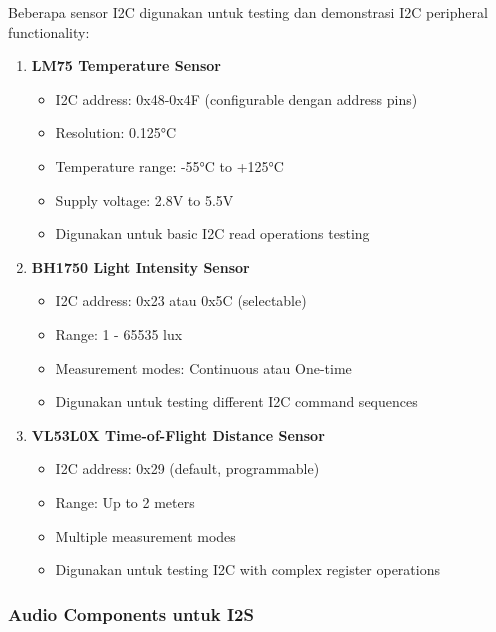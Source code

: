 Beberapa sensor I2C digunakan untuk testing dan demonstrasi I2C peripheral functionality:

\begin{enumerate}
	\item \textbf{LM75 Temperature Sensor}
	\begin{itemize}
		\item I2C address: 0x48-0x4F (configurable dengan address pins)
		\item Resolution: 0.125°C
		\item Temperature range: -55°C to +125°C
		\item Supply voltage: 2.8V to 5.5V
		\item Digunakan untuk basic I2C read operations testing
	\end{itemize}
	
	\item \textbf{BH1750 Light Intensity Sensor}
	\begin{itemize}
		\item I2C address: 0x23 atau 0x5C (selectable)
		\item Range: 1 - 65535 lux
		\item Measurement modes: Continuous atau One-time
		\item Digunakan untuk testing different I2C command sequences
	\end{itemize}
	
	\item \textbf{VL53L0X Time-of-Flight Distance Sensor}
	\begin{itemize}
		\item I2C address: 0x29 (default, programmable)
		\item Range: Up to 2 meters
		\item Multiple measurement modes
		\item Digunakan untuk testing I2C with complex register operations
	\end{itemize}
\end{enumerate}

\subsubsection{Audio Components untuk I2S}

